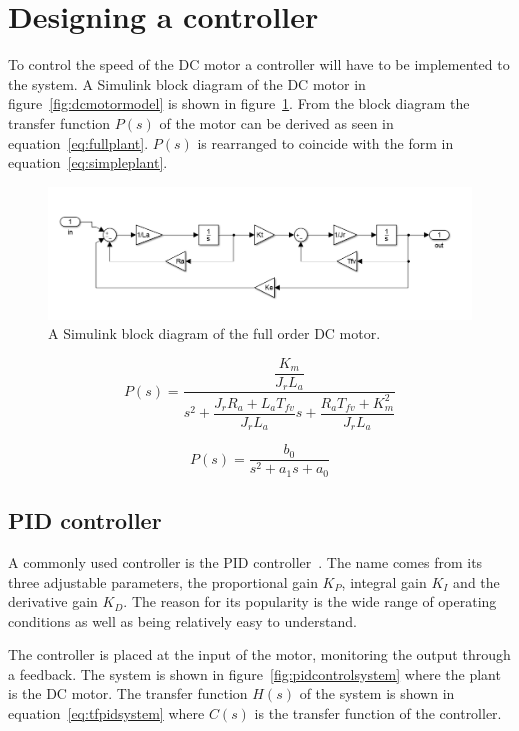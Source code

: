 \section{Designing a controller}
\label{sec:controller}

To control the speed of the DC motor a controller will have to be implemented to the system. A Simulink block diagram of the DC motor in figure~\ref{fig:dcmotormodel} is shown in figure~\ref{fig:dcblock}. From the block diagram the transfer function $P(s)$ of the motor can be derived as seen in equation~\ref{eq:fullplant}. $P(s)$ is rearranged to coincide with the form in equation~\ref{eq:simpleplant}. 
\begin{figure}[!h]
	\centering
	\includegraphics[width=1\linewidth]{graphics/dcblockdiagram}
	\caption{A Simulink block diagram of the full order DC motor.}
	\label{fig:dcblock}
\end{figure}


\begin{equation}
\label{eq:fullplant}
P(s) = \dfrac{\dfrac{K_m}{J_r L_a}}{s^2 + \dfrac{J_r R_a + L_a T_{fv}}{J_r L_a}s + \dfrac{R_a T_{fv} +K_m^2}{J_r L_a}}
\end{equation}

\begin{equation}
\label{eq:simpleplant}
P(s) = \dfrac{b_0}{s^2 + a_1 s + a_0}
\end{equation}


\subsection{PID controller}
 A commonly used controller is the PID controller~\cite{feedback}. 
 The name comes from its three adjustable parameters, the proportional gain $K_{P}$, integral gain $K_{I}$ and the derivative gain $K_{D}$. 
 The reason for its popularity is the wide range of operating conditions as well as being relatively easy to understand. 
 
 The controller is placed at the input of the motor, monitoring the output through a feedback. 
 The system is shown in figure~\ref{fig:pidcontrolsystem} where the plant is the DC motor. 
 The transfer function $H(s)$ of the system is shown in equation~\ref{eq:tfpidsystem} where $C(s)$ is the transfer function of the controller.

